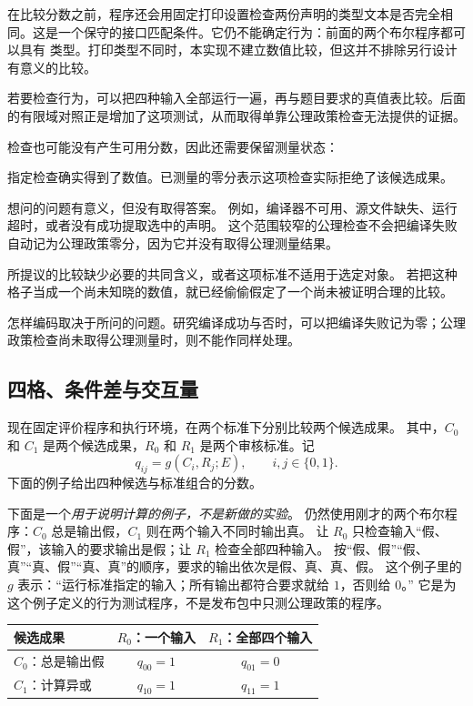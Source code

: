在比较分数之前，程序还会用固定打印设置检查两份声明的类型文本是否完全相同。这是一个保守的接口匹配条件。它仍不能确定行为：前面的两个布尔程序都可以具有  类型。打印类型不同时，本实现不建立数值比较，但这并不排除另行设计有意义的比较。

若要检查行为，可以把四种输入全部运行一遍，再与题目要求的真值表比较。后面的有限域对照正是增加了这项测试，从而取得单靠公理政策检查无法提供的证据。

检查也可能没有产生可用分数，因此还需要保留测量状态：

\begin{description}[leftmargin=1.2em,style=nextline]
\item[已测量。] 指定检查确实得到了数值。已测量的零分表示这项检查实际拒绝了该候选成果。
\item[未运行、材料缺失或结果不确定。] 想问的问题有意义，但没有取得答案。
例如，编译器不可用、源文件缺失、运行超时，或者没有成功提取选中的声明。
这个范围较窄的公理检查不会把编译失败自动记为公理政策零分，因为它并没有取得公理测量结果。
\item[无效或不适用。] 所提议的比较缺少必要的共同含义，或者这项标准不适用于选定对象。
若把这种格子当成一个尚未知晓的数值，就已经偷偷假定了一个尚未被证明合理的比较。
\end{description}

怎样编码取决于所问的问题。研究编译成功与否时，可以把编译失败记为零；公理政策检查尚未取得公理测量时，则不能作同样处理。

\subsection{四格、条件差与交互量}
\label{subsec:four-cells}

现在固定评价程序和执行环境，在两个标准下分别比较两个候选成果。
其中，$C_0$ 和 $C_1$ 是两个候选成果，$R_0$ 和 $R_1$ 是两个审核标准。记
\[
q_{ij}=g(C_i,R_j;E),\qquad i,j\in\{0,1\}.
\]
下面的例子给出四种候选与标准组合的分数。

下面是一个\emph{用于说明计算的例子，不是新做的实验}。
仍然使用刚才的两个布尔程序：$C_0$ 总是输出假，$C_1$ 则在两个输入不同时输出真。
让 $R_0$ 只检查输入“假、假”，该输入的要求输出是假；让 $R_1$ 检查全部四种输入。
按“假、假”“假、真”“真、假”“真、真”的顺序，要求的输出依次是假、真、真、假。
这个例子里的 $g$ 表示：“运行标准指定的输入；所有输出都符合要求就给 $1$，否则给 $0$。”
它是为这个例子定义的行为测试程序，不是发布包中只测公理政策的程序。

\begin{center}
\begin{tabular}{lcc}
\toprule
候选成果 & $R_0$：一个输入 & $R_1$：全部四个输入\\
\midrule
$C_0$：总是输出假 & $q_{00}=1$ & $q_{01}=0$\\
$C_1$：计算异或 & $q_{10}=1$ & $q_{11}=1$\\
\bottomrule
\end{tabular}
\end{center}

